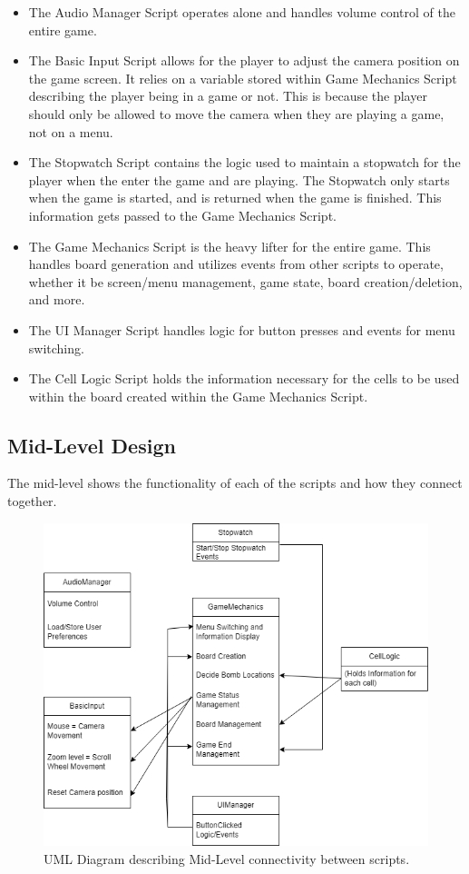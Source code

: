 \begin{itemize}
    \item The Audio Manager Script operates alone and handles volume control of the entire game.
    \item The Basic Input Script allows for the player to adjust the camera position on the game screen.
    It relies on a variable stored within Game Mechanics Script describing the player being in a game or not.
    This is because the player should only be allowed to move the camera when they are playing a game, not on a menu.
    \item The Stopwatch Script contains the logic used to maintain a stopwatch for the player when the enter the game and are playing.
    The Stopwatch only starts when the game is started, and is returned when the game is finished.
    This information gets passed to the Game Mechanics Script.
    \item The Game Mechanics Script is the heavy lifter for the entire game. 
    This handles board generation and utilizes events from other scripts to operate, whether it be screen/menu management, game state, board creation/deletion, and more.
    \item The UI Manager Script handles logic for button presses and events for menu switching.
    \item The Cell Logic Script holds the information necessary for the cells to be used within the board created within the Game Mechanics Script.
\end{itemize}

\subsection{Mid-Level Design}
\label{subsec:MLDesign}

The mid-level shows the functionality of each of the scripts and how they connect together.

\begin{figure}[h]
    \centering
    \includegraphics[width=12cm]{Images/MLDesignLogView.png}
       \caption{UML Diagram describing Mid-Level connectivity between scripts.}
           \label{Fig:MLDesignLogView}
\end{figure}

